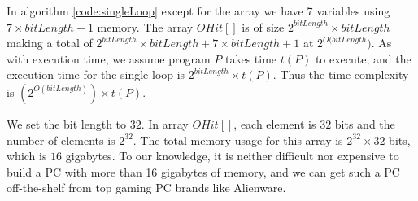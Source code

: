 In algorithm \ref{code:singleLoop} except for the array we have 7 variables using $7 \times bitLength + 1$ memory. The array $OHit[]$ is of size $2^{bitLength} \times bitLength$ making a total of $2^{bitLength} \times bitLength + 7 \times bitLength + 1$ at $2^{O(bitLength})$. As with execution time, we assume program $P$ takes time $t(P)$ to execute, and the execution time for the single loop is $2^{bitLength} \times t(P)$. Thus the time complexity is $(2^{O(bitLength)}) \times t(P)$.

We set the bit length to $32$. In array $OHit[]$, each element is $32$ bits and the number of elements is $2^{32}$. The total memory usage for this array is $2^{32} \times 32$ bits, which is $16$ gigabytes. To our knowledge, it is neither difficult nor expensive to build a PC with more than 16 gigabytes of memory, and we can get such a PC off-the-shelf from top gaming PC brands like Alienware. 